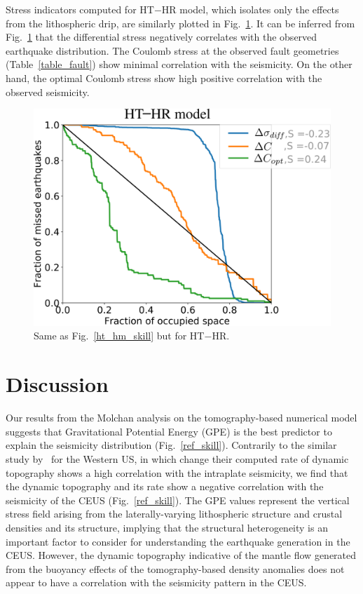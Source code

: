 \documentclass[draft,linenumbers]{agujournal2018}
\begin{document}
Stress indicators computed for HT$-$HR model, which isolates only the effects from the lithospheric drip, are similarly plotted in Fig.~\ref{ht_hr_skill}. It can be inferred from Fig.~\ref{ht_hr_skill} that the differential stress negatively correlates with the observed earthquake distribution. The Coulomb stress at the observed fault geometries (Table~\ref{table_fault}) show minimal correlation with the seismicity. On the other hand, the optimal Coulomb stress show high positive correlation with the observed seismicity.
%
\begin{figure}
\centering
	\includegraphics[width=0.6\linewidth]{figures/ht_hr_updated.png}
	\caption{Same as Fig.~\ref{ht_hm_skill} but for HT$-$HR.}
	\label{ht_hr_skill}
\end{figure}

%
\section{Discussion}

Our results from the Molchan analysis on the tomography-based numerical model suggests that Gravitational Potential Energy (GPE) is the best predictor to explain the seismicity distribution (Fig.~\ref{ref_skill}).  Contrarily to the similar study by~\citet{becker2015western} for the Western US, in which change their computed rate of dynamic topography shows a high correlation with the intraplate seismicity, we find that the dynamic topography and its rate show a negative correlation with the seismicity of the CEUS  (Fig.~\ref{ref_skill}). The GPE values represent the vertical stress field arising from the laterally-varying lithospheric structure and crustal densities and its structure, implying that the structural heterogeneity is an important factor to consider for understanding the earthquake generation in the CEUS. However, the dynamic topography indicative of the mantle flow generated from the buoyancy effects of the tomography-based density anomalies does not appear to have a correlation with the seismicity pattern in the CEUS.
    
\end{document}
